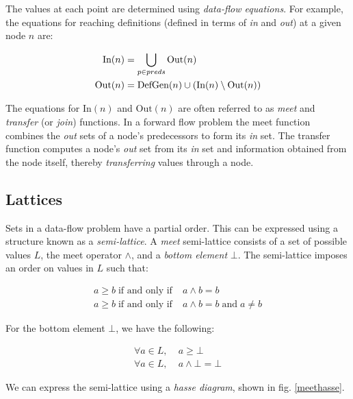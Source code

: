 \documentclass[bsc,twoside,singlespacing,parskip,logo]{infthesis}     %
\begin{document}
        The values at each point are determined using {\em data-flow equations}. For example, the equations for reaching definitions (defined in terms of {\em in} and {\em out}) at a given node $n$ are:
        
        \begin{align}
        \textnormal{In}(n) &= \bigcup_{p \in preds} \textnormal{Out}(n) \\
        \textnormal{Out}(n) &= \textnormal{DefGen}(n) \cup (\textnormal{In}(n) \setminus \textnormal{Out}(n))
        \end{align}
        
        The equations for $\text{In}(n)$ and $\text{Out}(n)$ are often referred to as {\em meet} and {\em transfer} (or {\em join}) functions. In a forward flow problem the meet function combines the {\em out} sets of a node's predecessors to form its {\em in} set. The transfer function computes a node's {\em out} set from its {\em in} set and information obtained from the node itself, thereby {\em transferring} values through a node.

		\subsection{Lattices}
		Sets in a data-flow problem have a partial order. This can be expressed using a structure known as a {\em semi-lattice}. A {\em meet} semi-lattice consists of a set of possible values $L$, the meet operator $\land$, and a {\em bottom element} $\bot$. The semi-lattice imposes an order on values in $L$ such that:
        
        \begin{align}
        a \geq b \;\text{if and only if}\;& a \land b = b \\
        a \ge  b \;\text{if and only if}\;& a \land b = b \;\text{and}\; a \neq b
        \end{align}
        
        For the bottom element $\bot$, we have the following:
        
        \begin{align}
        \forall a \in L,\; & a \geq \bot \\
        \forall a \in L,\; & a \land \bot = \bot
        \end{align}
        
        We can express the semi-lattice using a {\em hasse diagram}, shown in fig. \ref{meethasse}.
\end{document}
